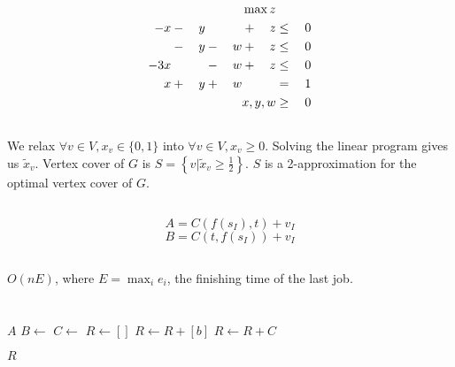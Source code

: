 \documentclass[a4paper,11pt,oneside,onecolumn]{article}
\begin{document}
\subsection{}

\begin{alignat*}{6}
 & & &        & &        & \llap{$\max z$} & & \\
-x  & {}-{} & y & & & {}+{} & z & {}\le{} & 0 \\
& {}-{} & y  & {}-{} & w & {}+{} & z & {}\le{} & 0 \\
-3x & & & {}-{} & w & {}+{} & z & {}\le{} & 0 \\
x & {}+{} & y & {}+{} & w & & & {}={} & 1 \\
 & & &        & &        & \llap{$x,y,w$} & {}\ge{} & 0 \\
\end{alignat*}

\subsection{}

We relax $\forall v \in V, x_v \in \{0,1\}$ into $\forall v \in V, x_v \ge 0$. Solving the linear program gives us $\tilde{x}_v$.
Vertex cover of $G$ is $S = \left\{ v | \tilde{x}_v \ge \frac{1}{2} \right\} $. $S$ is a 2-approximation for the optimal vertex cover of $G$.

\subsection{}

$$ A = C\left( f(s_I), t \right) + v_I $$
$$ B = C\left( t, f(s_I) \right) + v_I $$

\subsection{}

$ O(nE) $, where $ E = \max_i e_i $, the finishing time of the last job.

\section{}

\subsection{}

\begin{algorithmic}
        \State \Return $A$
    \Else
        \State $B \gets $ 
        \State $C \gets $ 
        \State $R \gets []$
                \State $R \gets R + [b]$
            \EndIf
        \EndFor
        \State $R \gets R + C$

        \State \Return $R$
    \EndIf
\EndFunction

\vspace{2em}

\end{algorithmic}
\end{document}
